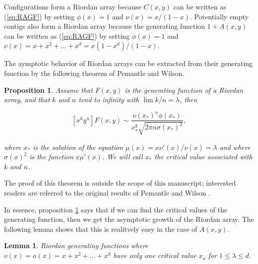 \documentclass{article}
\newtheorem{lemma}{Lemma}
\newtheorem{proposition}{Proposition}
\begin{document}
Configurations form a Riordan array because $C(x,y)$ can be written as
(\ref{eq:RAGF}) by setting $\phi(x) = 1$ and $\nu(x) = x/(1-x)$.
Potentially empty contigs also form a Riordan array because the generating
function $1+A(x,y)$ can be written as (\ref{eq:RAGF}) by setting $\phi(x)
= 1$ and $\nu(x) = x+x^2+\ldots+x^d = x(1-x^d)/(1-x)$.

The aymptotic behavior of Riordan arrays can be extracted from their
generating function by the following theorem of Pemantle and Wilson.

\begin{proposition}
\label{th:PW}
Assume that $F(x,y)$ is the generating function of a Riordan array, and
that $k$ and $n$ tend to infinity with $\lim k/n = \lambda$, then

\begin{equation}
\label{eq:assRA}
[x^ky^n]F(x,y) \sim \frac{\nu(x_*)^n\phi(x_*)}
  {x_*^k\sqrt{2\pi n \sigma(x_*)^2}},
\end{equation}

\noindent
where $x_*$ is the solution of the equation $\mu(x) =
x\nu'(x)/\nu(x) = \lambda$ and where $\sigma(x)^2$ is the function $x
\mu'(x)$. We will call $x_*$ the critical value associated with $k$ and
$n$.
\end{proposition}

The proof of this theorem is outside the scope of this manuscript;
interested readers are referred to the original results of Pemantle and
Wilson \cite{PemWil02,AnalComb2013}.

In essence, proposition \ref{th:PW} says that if we can find the critical
values of the generating function, then we get the asymptotic growth of
the Riordan array. The following lemma shows that this is realitvely easy
in the case of
$A(x,y)$.

\begin{lemma}
\label{th:mu}
Riordan generating functions where $\nu(x) = a(x) = x+x^2+\ldots+x^d$
have only one critical value $x_a$ for $1 \leq \lambda \leq d$.
\end{lemma}
\end{document}
